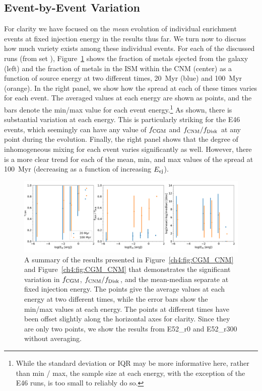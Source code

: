 \subsection{Event-by-Event Variation}
\label{ch4:sec:individual event variation}

For clarity we have focused on the \textit{mean} evolution of individual enrichment events at fixed injection energy in the results thus far. We turn now to discuss how much variety exists among these individual events. For each of the discussed runs (from set \runonenu), Figure~\ref{ch4:fig:CGM_CNM_variance} shows the fraction of metals ejected from the galaxy (left) and the fraction of metals in the ISM within the CNM (center) as a function of source energy at two different times, 20~Myr (blue) and 100~Myr (orange). In the right panel, we show how the spread at each of these times varies for each event. The averaged values at each energy are shown as points, and the bars denote the min/max value for each event energy.\footnote{While the standard deviation or IQR may be more informative here, rather than min / max, the sample size at each energy, with the exception of the E46 runs, is too small to reliably do so.} As shown, there is substantial variation at each energy. This is particularly striking for the E46 events, which seemingly can have any value of $f_{\rm CGM}$ and $f_{\rm CNM} / f_{\rm Disk}$ at any point during the evolution. Finally, the right panel shows that the degree of inhomogeneous mixing for each event varies significantly as well. However, there is a more clear trend for each of the mean, min, and max values of the spread at 100~Myr (decreasing as a function of increasing $E_{\rm ej}$).

 \begin{figure}
   \centering
   \includegraphics[width=0.975\linewidth]{figures/ch4/II_Eej_CNM_avg}
   \caption{A summary of the results presented in Figure~\ref{ch4:fig:CGM_CNM} and Figure~\ref{ch4:fig:CGM_CNM} that demonstrates the significant variation in $f_{\rm CGM}$, $f_{\rm CNM} / f_{\rm Disk}$, and the mean-median separate at fixed injection energy. The points give the average values at each energy at two different times, while the error bars show the min/max values at each energy. The points at different times have been offset slightly along the horizontal axes for clarity. Since they are only two points, we show the results from \runone E52\_r0 and \runone E52\_r300 without averaging.}
   \label{ch4:fig:CGM_CNM_variance}
 \end{figure}


